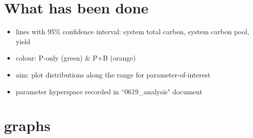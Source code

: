 \documentclass[a4paper]{article}
\begin{document}
\section{What has been done}
\begin{itemize}
    \item lines with 95\% confidence interval: system total carbon, system carbon pool, yield
    \item colour: P-only (green) \& P+B (orange)
    \item aim: plot distributions along the range for parameter-of-interest
    \item parameter hyperspace recorded in ``0619\_analysis" document
\end{itemize}

\section{graphs}
\end{document}
